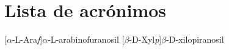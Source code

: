 \chapter*{Lista de acrónimos}

\begin{acronym}[TDMA] 
[$\alpha$-{\scriptsize L}-{A}ra\textit{f}]{$\alpha$-{\scriptsize L}-arabinofuranosil}
[$\beta$-{\scriptsize D}-{X}yl\textit{p}]{$\beta$-{\scriptsize D}-xilopiranosil}
\end{acronym}

